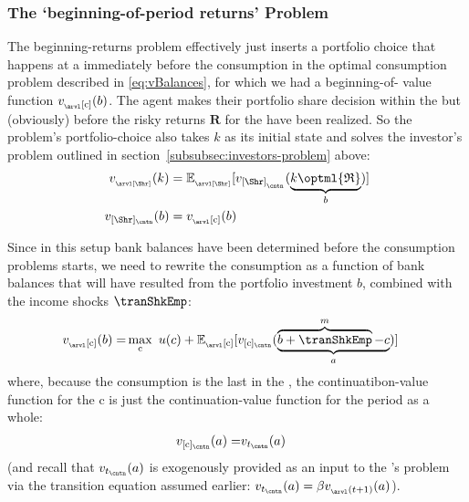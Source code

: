 \documentclass[titlepage, headings=optiontotocandhead]{econtex}
\begin{document}
\subsubsection{The `beginning-of-period returns' Problem}\label{subsubsec:beginning-returns}
The beginning-returns problem effectively just inserts a portfolio choice that happens at a {\stg} immediately before the consumption {\stg} in the optimal consumption problem described in \eqref{eq:vBalances}, for which we had a beginning-of-{\stg} value function $v_{_\arvl[\mathrm{c}]}(b)$.  The agent makes their portfolio share decision within the {\stg} but (obviously) before the risky returns ${\mathbf{R}}$ for the {\interval} have been realized.  So the problem's portfolio-choice {\stg} also takes $k$ as its initial state and solves the investor's problem outlined in section~\ref{subsubsec:investors-problem} above:
\begin{equation}\begin{gathered}\begin{aligned}
  v_{_\arvl[\Shr]}(k) & = {\mathbb{E}}_{_\arvl[\Shr]}[v_{[\Shr]_{_\cntn}}(\underbrace{k\optml{\mathfrak{R}}}_{b})]
\\ v_{[\Shr]_\cntn}(b)  & = v_{_\arvl[\mathrm{c}]}(b)
    \end{aligned}\end{gathered}\end{equation}

Since in this setup bank balances have been determined before the consumption problems starts, we need to rewrite the consumption {\stg}  as a function of bank balances that will have resulted from the portfolio investment $b$, combined with the income shocks $\tranShkEmp$:
\begin{equation}\begin{gathered}\begin{aligned}
      v_{_\arvl[\mathrm{c}]}(b) = & \max_{\mathrm{c}}~ u(c) + {\mathbb{E}}_{_\arvl[\mathrm{c}]}[v_{[\mathrm{c}]_\cntn}(\underbrace{\overbrace{b+\tranShkEmp}^{m}-c}_{a})]
    \end{aligned}\end{gathered}\end{equation}
where, because the consumption {\stg} is the last {\stg} in the {\interval}, the continuatibon-value function for the $\mathrm{c}$ {\stg} is just the continuation-value function for the period as a whole:
\begin{equation}\begin{gathered}\begin{aligned}
      v_{[\mathrm{c}]_\cntn}(a) = & v_{t_\cntn}(a)
    \end{aligned}\end{gathered}\end{equation}
(and recall that $v_{t_\cntn}(a)$ is exogenously provided as an input to the {\interval}'s problem via the transition equation assumed earlier: $v_{t_\cntn}(a)=\beta v_{_\arvl(t+1)}(a)$).
\end{document}
